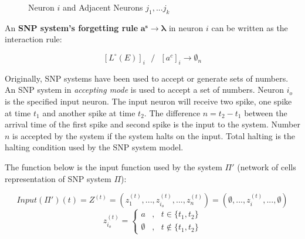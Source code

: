 \documentclass[a4paper]{article}
\theoremstyle{definition}
\newcommand{\ra}{\rightarrow}
\newcommand{\ts}{\text{ }}
\begin{document}
\begin{figure}[H]
\begin{center}                                                                                           
\end{center}                                                                                             
\caption{Neuron $i$ and Adjacent Neurons $j_1,...j_k$}\label{fig-snp}
\end{figure} 

An \textbf{SNP system's forgetting rule} $\mathbf{a^s \ra \lambda}$ in neuron $i$ can be written as 
the interaction rule:

$${[L^{\circ}(E)]}_i\ts/\ts {[a^c]}_i \ra \emptyset_n$$

Originally, SNP systems have been used to accept or generate sets of numbers. An SNP system in 
\emph{accepting mode} is used to accept a set of numbers. Neuron $i_o$ is the specified input 
neuron. The input neuron will receive two spike, one spike at time $t_1$ and another spike at time
$t_2$. The difference $n = t_2-t_1$ between the arrival time of the first spike and second spike
is the input to the system. Number $n$ is accepted by the system if the system halts on the input.
Total halting is the halting condition used by the SNP system model. 

The function below is the input function used by the system $\Pi'$ (network of cells representation
of SNP system $\Pi$):

$$Input(\Pi')(t) = Z^{(t)} = (z_1^{(t)},...,z_{i_o}^{(t)},...,z_n^{(t)}) =
(\emptyset,...,z_i^{(t)},...,\emptyset)$$
\[
z_{i_o}^{(t)} =
\begin{cases} 
a           & ,\ts t \in \{t_1,t_2\} \\
\emptyset   & ,\ts t \notin \{t_1,t_2\}
\end{cases}
\]
\end{document}
